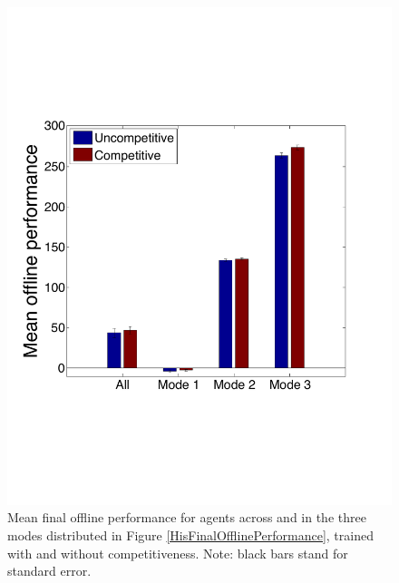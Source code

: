 \begin{figure}[htb]
\vspace{4mm}
\centering
\includegraphics[width=0.5\columnwidth, trim=0 0 0 0, clip]{CompetitionPerMode}%
\caption{Mean final offline performance for agents across and in the three modes distributed in Figure \ref{HisFinalOfflinePerformance}, trained with and without competitiveness. %
Note: black bars stand for standard error.}
\label{Mode}
\end{figure}


